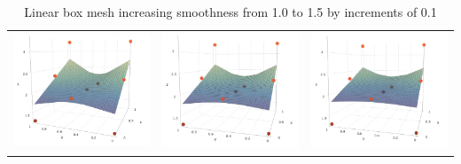 \documentclass[11pt,margin=1in]{article}
\begin{document}
\begin{table}[!htbp]
  \centering
  \begin{tabular}{ccc}
    \includegraphics[width=5cm]{Lin-1-3} & \includegraphics[width=5cm]{Lin-1-4} & \includegraphics[width=5cm]{Lin-1-5} \\
  \end{tabular}
  \caption{Linear box mesh increasing smoothness from 1.0 to 1.5 by
    increments of 0.1}
\end{table}  
\end{document}
